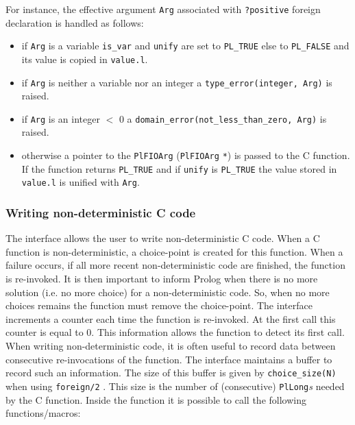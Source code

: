 For instance, the effective argument \texttt{Arg} associated with
\texttt{?positive} foreign declaration is handled as follows:

\begin{itemize}

\item if \texttt{Arg} is a variable \texttt{is\_var} and \texttt{unify} are
set to \texttt{PL\_TRUE} else to \texttt{PL\_FALSE} and its value is copied in
\texttt{value.l}.

\item if \texttt{Arg} is neither a variable nor an integer a
\texttt{type\_error(integer, Arg)} is raised.

\item if \texttt{Arg} is an integer $<$ 0 a
\texttt{domain\_error(not\_less\_than\_zero, Arg)} is raised.

\item otherwise a pointer to the \texttt{PlFIOArg} (\texttt{PlFIOArg}
\texttt{*}) is passed to the C function. If the function returns
\texttt{PL\_TRUE} and if \texttt{unify} is \texttt{PL\_TRUE} the value stored in
\texttt{value.l} is unified with \texttt{Arg}.

\end{itemize}

\subsubsection{Writing non-deterministic C code}
\label{Writing-non-deterministic-C-code}
The interface allows the user to write non-deterministic C code. When a C
function is non-deterministic, a choice-point is created for this function.
When a failure occurs, if all more recent non-deterministic code are
finished, the function is re-invoked. It is then important to inform Prolog
when there is no more solution (i.e. no more choice) for a non-deterministic
code. So, when no more choices remains the function must remove the
choice-point. The interface increments a counter each time the function is
re-invoked. At the first call this counter is equal to 0. This information
allows the function to detect its first call. When writing non-deterministic
code, it is often useful to record data between consecutive re-invocations of
the function. The interface maintains a buffer to record such an
information. The size of this buffer is given by
\texttt{choice\_size(N)} when using \texttt{foreign/2}
. This size is the number of (consecutive)
\texttt{PlLong}\emph{s} needed by the C function. Inside the function it is
possible to call the following functions/macros:

